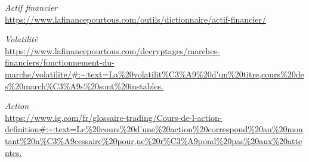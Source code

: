 \begin{thebibliography}{13}
    \textit{Actif financier}\\
    \url{https://www.lafinancepourtous.com/outils/dictionnaire/actif-financier/}

    \textit{Volatilité}\\
    \url{https://www.lafinancepourtous.com/decryptages/marches-financiers/fonctionnement-du-marche/volatilite/#:~:text=La%20volatilit%C3%A9%20d'un%20titre,cours%20des%20march%C3%A9s%20sont%20instables.}

    \textit{Action}\\
    \url{https://www.ig.com/fr/glossaire-trading/Cours-de-l-action-definition#:~:text=Le%20cours%20d'une%20action%20correspond%20au%20montant%20n%C3%A9cessaire%20pour,ne%20r%C3%A9pond%20pas%20aux%20attentes.}

    \end{thebibliography}
\newpage

\printbibliography

\newpage

\tableofcontents
\setcounter{tocdepth}{3}
